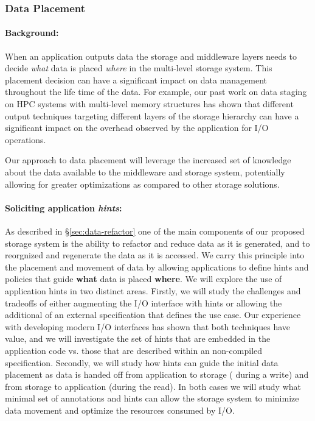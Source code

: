 \subsubsection{Data Placement}
\label{sec:init-plac-data}

\paragraph{Background:}
When an application outputs data the storage and middleware layers needs to
decide \textit{what} data is placed \textit{where} in the multi-level storage system. 
This placement decision can have a significant impact on data management 
throughout the life time of the data. For example, our past work on data 
staging~\cite{tongipdps15,qiansc15,docan2012dataspaces,abbasi2010datastager} 
on HPC systems with multi-level memory structures has shown that different 
output techniques targeting different layers of the storage hierarchy can have a 
significant impact on the overhead observed by the application for I/O operations. 


Our approach to data placement will leverage the increased set of knowledge about the data available to the middleware and storage system, potentially allowing for greater optimizations as compared to other storage solutions.

\paragraph{Soliciting application {\em hints}:}
As described in \S\ref{sec:data-refactor} one of the main components of our
proposed storage system is the ability to refactor and reduce data as it is
generated, and to reorgnized and regenerate the data as it is accessed. We
carry this principle into the placement and movement of data by allowing
applications to define hints and policies that guide \textbf{what} data is
placed \textbf{where}. We will explore the use of application hints in two
distinct areas. Firstly, we will study the challenges and tradeoffs of either
augmenting the I/O interface with hints or allowing the additional of an
external specification that defines the use case. Our experience with
developing modern I/O interfaces has shown that both techniques have value,
and we will investigate the set of hints that are embedded in the
application code vs. those that are described within an non-compiled
specification. Secondly, we will study how hints can guide the initial data
placement as data is handed off from application to storage ( during a
write) and from storage to application (during the read). In both cases we
will study what minimal set of annotations and hints can allow the storage
system to minimize data movement and optimize the resources consumed by I/O. 

